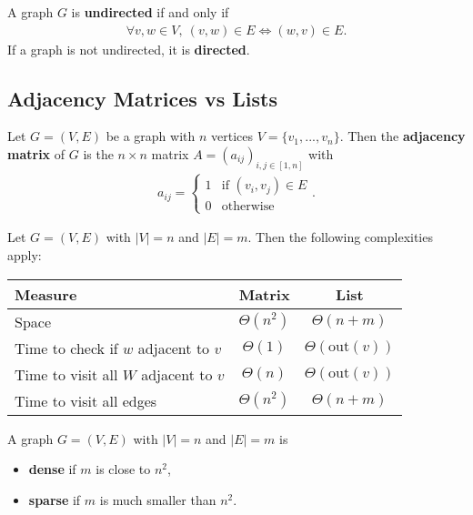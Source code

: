 \documentclass{article}
\begin{document}
\begin{definition}
	A graph $G$ is \textbf{undirected} if and only if
	\begin{align*}
		\forall v,w\in V,\: (v,w)\in E \Leftrightarrow (w,v)\in E.
	\end{align*}
	If a graph is not undirected, it is \textbf{directed}.
\end{definition}

\subsection{Adjacency Matrices vs Lists}

\begin{definition}
	Let $G=(V,E)$ be a graph with $n$ vertices $V=\{v_1, ..., v_n\}$.
	Then the \textbf{adjacency matrix} of $G$ is the $n\times n$ matrix
	$A=(a_{ij})_{i,j\in[1,n]}$ with 
	\begin{align*}
		a_{ij} = \begin{cases}
			1 &\text{if } (v_i,v_j)\in E\\
			0 &\text{otherwise}
		\end{cases}.
	\end{align*}
\end{definition}

\begin{theorem}
	Let $G=(V,E)$ with $|V|=n$ and $|E|=m$. Then the following 
	complexities apply:
	\begin{center}
	\begin{tabular}{| l | c | c |}
		\hline
		 Measure & Matrix & List\\
		\hline
		Space & $\Theta(n^2)$ & $\Theta(n+m)$ \\
		\hline
		Time to check if $w$ adjacent to $v$ & $\Theta(1)$ & $\Theta(\text{out}(v))$\\
		\hline
		Time to visit all $W$ adjacent to $v$ & $\Theta(n)$ & $\Theta(\text{out}(v))$\\
		\hline
		Time to visit all edges & $\Theta(n^2)$ & $\Theta(n+m)$\\
		\hline
	\end{tabular}
\end{center}
\begin{lemma}
	A graph $G=(V,E)$ with $|V|=n$ and $|E|=m$ is
	\begin{itemize}
		\item \textbf{dense} if $m$ is close to $n^2$,
		\item \textbf{sparse} if $m$ is much smaller than $n^2$. 
	\end{itemize}
\end{lemma}
\end{theorem}
\end{document}
